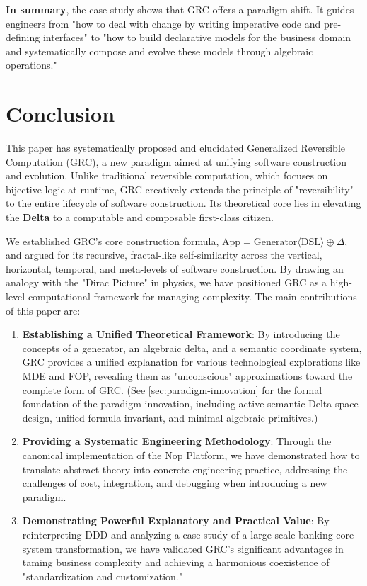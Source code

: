 \documentclass[11pt]{article}
\begin{document}
\textbf{In summary}, the case study shows that GRC offers a paradigm shift. It guides engineers from "how to deal with change by writing imperative code and pre-defining interfaces" to "how to build declarative models for the business domain and systematically compose and evolve these models through algebraic operations."

\section{Conclusion}

This paper has systematically proposed and elucidated Generalized Reversible Computation (GRC), a new paradigm aimed at unifying software construction and evolution. Unlike traditional reversible computation, which focuses on bijective logic at runtime, GRC creatively extends the principle of "reversibility" to the entire lifecycle of software construction. Its theoretical core lies in elevating the \textbf{Delta} to a computable and composable first-class citizen.

We established GRC's core construction formula, $\text{App} = \text{Generator}\langle\text{DSL}\rangle \oplus \Delta$, and argued for its recursive, fractal-like self-similarity across the vertical, horizontal, temporal, and meta-levels of software construction. By drawing an analogy with the "Dirac Picture" in physics, we have positioned GRC as a high-level computational framework for managing complexity. The main contributions of this paper are:

\begin{enumerate}
    \item \textbf{Establishing a Unified Theoretical Framework}: By introducing the concepts of a generator, an algebraic delta, and a semantic coordinate system, GRC provides a unified explanation for various technological explorations like MDE and FOP, revealing them as "unconscious" approximations toward the complete form of GRC. (See \autoref{sec:paradigm-innovation} for the formal foundation of the paradigm innovation, including active semantic Delta space design, unified formula invariant, and minimal algebraic primitives.)
    \item \textbf{Providing a Systematic Engineering Methodology}: Through the canonical implementation of the Nop Platform, we have demonstrated how to translate abstract theory into concrete engineering practice, addressing the challenges of cost, integration, and debugging when introducing a new paradigm.
    \item \textbf{Demonstrating Powerful Explanatory and Practical Value}: By reinterpreting DDD and analyzing a case study of a large-scale banking core system transformation, we have validated GRC's significant advantages in taming business complexity and achieving a harmonious coexistence of "standardization and customization."
\end{enumerate}
\end{document}
